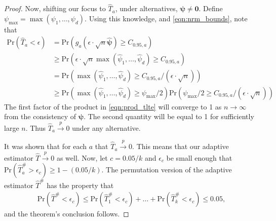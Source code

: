 \documentclass{article}
\newcommand{\pr}{\text{Pr}}
\begin{document}
\begin{proof}
Now, shifting our focus to $\hat{T}_a$, under alternatives, $\boldsymbol{\psi} \neq \boldsymbol{0}$. Define $\psi_{\max} = \max(\psi_1, \dots, \psi_d)$.  Using this knowledge, and \eqref{eqn:nrm_bounds}, note that 
\begin{align}
\pr\left(\hat{T}_a < \epsilon\right) &= \pr\left(g_a\left(\epsilon \cdot \sqrt{n} \hat{\boldsymbol{\psi}}\right) \geq C_{0.95, a}\right) \nonumber\\
&\geq \pr\left(\epsilon \cdot \sqrt{n}\max(\hat{\psi}_1, \dots, \hat{\psi}_d) \geq C_{0.95, a}\right) \nonumber \\
&= \pr\left(\max(\hat{\psi}_1, \dots, \hat{\psi}_d) \geq C_{0.95, a}/\left(\epsilon \cdot \sqrt{n}\right)\right) \nonumber \\
&\geq \pr\left(\max(\hat{\psi}_1, \dots, \hat{\psi}_d) \geq \psi_{\max}/2\right) \pr\left(\psi_{\max}/2\geq C_{0.95, a}/\left(\epsilon \cdot \sqrt{n}\right)\right) \label{eqn:prod_tlte} 
\end{align}
The first factor of the product in \eqref{eqn:prod_tlte} will converge to 1 as $n \to \infty$ from the consistency of $\hat{\boldsymbol{\psi}}$.  The second quantity will be equal to 1 for sufficiently large $n$.   Thus $\hat{T}_a \xrightarrow{p} 0$ under any alternative.   

It was shown that for each $a$ that $\hat{T}_a \xrightarrow{p} 0$.  This means that our adaptive estimator $\hat{T} \xrightarrow{p} 0$ as well.  Now, let $c = 0.05/k$ and $\epsilon_c$ be small enough that $\pr\left(\hat{T}^\#_a  > \epsilon_c\right) \geq 1 - (0.05/k)$.  The permutation version of the adaptive estimator $\hat{T}^\#$ has the property that
\begin{align*}
	\pr\left(\hat{T}^\# < \epsilon_c\right) \leq \pr(\hat{T}^\#_1 < \epsilon_c) + \dots + \pr(\hat{T}^\#_k < \epsilon_c) \leq 0.05,
\end{align*}
and the theorem's conclusion follows.
\end{proof}
\end{document}
